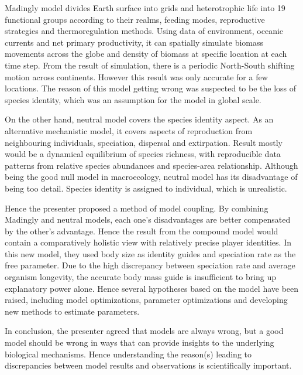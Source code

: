 \documentclass{article}
\begin{document}
    Madingly model divides Earth surface into grids and heterotrophic life into 19 functional groups according to their realms, feeding modes, reproductive strategies and thermoregulation methods.  Using data of environment, oceanic currents and net primary productivity, it can spatially simulate biomass movements across the globe and density of biomass at specific location at each time step.  From the result of simulation, there is a periodic North-South shifting motion across continents.  However this result was only accurate for a few locations.  The reason of this model getting wrong was suspected to be the loss of species identity, which was an assumption for the model in global scale.
    
    On the other hand, neutral model covers the species identity aspect.  As an alternative mechanistic model, it covers aspects of reproduction from neighbouring individuals, speciation, dispersal and extirpation.  Result mostly would be a dynamical equilibrium of species richness, with reproducible data patterns from relative species abundances and species-area relationship.  Although being the good null model in macroecology, neutral model has its disadvantage of being too detail.  Species identity is assigned to individual, which is unrealistic.
    
    Hence the presenter proposed a method of model coupling.  By combining Madingly and neutral models, each one's disadvantages are better compensated by the other's advantage.  Hence the result from the compound model would contain a comparatively holistic view with relatively precise player identities.  In this new model, they used body size as identity guides and speciation rate as the free parameter.  Due to the high discrepancy between speciation rate and average organism longevity, the accurate body mass guide is insufficient to bring up explanatory power alone.  Hence several hypotheses based on the model have been raised, including model optimizations, parameter optimizations and developing new methods to estimate parameters.
    
    In conclusion, the presenter agreed that models are always wrong, but a good model should be wrong in ways that can provide insights to the underlying biological mechanisms. Hence understanding the reason(s) leading to discrepancies between model results and observations is scientifically important.
\end{document}
